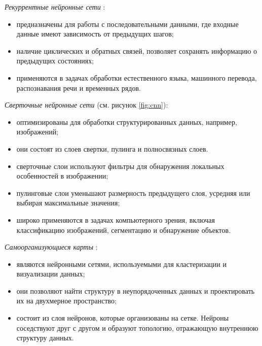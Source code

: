 \textit{Рекуррентные нейронные сети} \cite{recurrent}:
\begin{itemize}
    \item предназначены для работы с последовательными данными, где входные данные имеют зависимость от предыдущих шагов;
    \item наличие циклических и обратных связей, позволяет сохранять информацию о предыдущих состояниях;
    \item применяются в задачах обработки естественного языка, машинного перевода, распознавания речи и временных рядов.
\end{itemize}

\textit{Сверточные нейронные сети} \cite{cnns} (см. рисунок \ref{fig:cnn}):
\begin{itemize}
    \item оптимизированы для обработки структурированных данных, например, изображений;
    \item они состоят из слоев свертки, пулинга и полносвязных слоев.
    \item сверточные слои используют фильтры для обнаружения локальных особенностей в изображении;
    \item пулинговые слои уменьшают размерность предыдущего слоя, усредняя или выбирая максимальные значения;
    \item широко применяются в задачах компьютерного зрения, включая классификацию изображений, сегментацию и обнаружение объектов.
\end{itemize}

\textit{Самоорганизующиеся карты} \cite{soms}:
\begin{itemize}
    \item являются нейронными сетями, используемыми для кластеризации и визуализации данных;
    \item они позволяют найти структуру в неупорядоченных данных и проектировать их на двухмерное пространство;
    \item состоит из слоя нейронов, которые организованы на сетке. Нейроны соседствуют друг с другом и образуют топологию, отражающую внутреннюю структуру данных.
\end{itemize}


